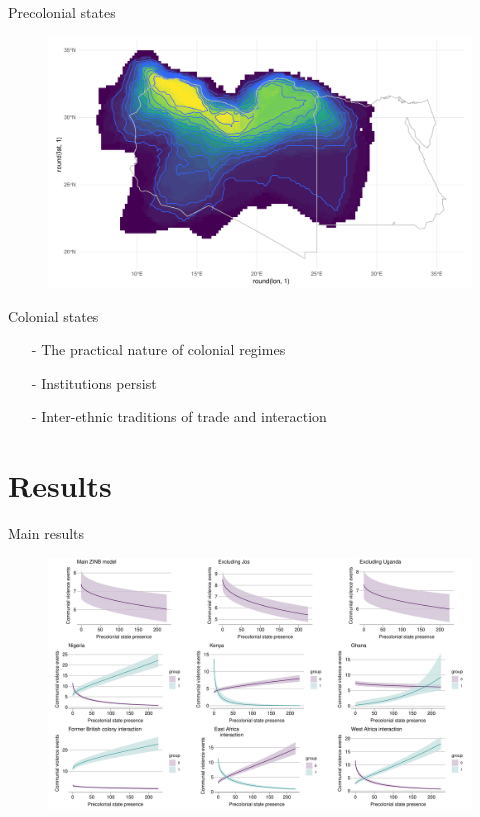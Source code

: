 \documentclass{beamer}
\begin{document}
\begin{frame}{Precolonial states}

	\begin{figure}[htpb]
		\centering
		\includegraphics[width=\linewidth]{img/libya.pdf}
	\end{figure}

\end{frame}

\begin{frame}{Colonial states}

\begin{itemize}
	\item[-] The practical nature of colonial regimes \pause 
	\item[-] Institutions persist \pause
	\item[-] Inter-ethnic traditions of trade and interaction
\end{itemize}	

\end{frame}

\section{Results}

\begin{frame}{Main results}

	\begin{figure}[htpb]
		\centering
		\includegraphics[width=\linewidth]{img/org3plots.pdf}
	\end{figure}

\end{frame}
\end{document}
